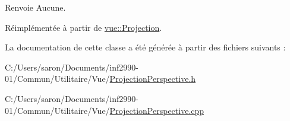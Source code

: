 \begin{DoxyReturn}{Renvoie}
Aucune. 
\end{DoxyReturn}


Réimplémentée à partir de \hyperlink{classvue_1_1_projection_a7726497f78c6b9e22bee96187755aa79}{vue\-::\-Projection}.



La documentation de cette classe a été générée à partir des fichiers suivants \-:\begin{DoxyCompactItemize}
\item 
C\-:/\-Users/saron/\-Documents/inf2990-\/01/\-Commun/\-Utilitaire/\-Vue/\hyperlink{_projection_perspective_8h}{Projection\-Perspective.\-h}\item 
C\-:/\-Users/saron/\-Documents/inf2990-\/01/\-Commun/\-Utilitaire/\-Vue/\hyperlink{_projection_perspective_8cpp}{Projection\-Perspective.\-cpp}\end{DoxyCompactItemize}
